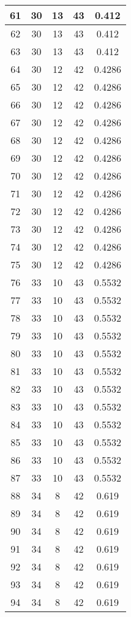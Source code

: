 \documentclass[letterpaper, 12pt]{article}
\begin{document}
\begin{longtable}{|c|c|c|c|c|}
\hline
61 & 30 & 13 & 43 & 0.412 \\
\hline
62 & 30 & 13 & 43 & 0.412 \\
\hline
63 & 30 & 13 & 43 & 0.412 \\
\hline
64 & 30 & 12 & 42 & 0.4286 \\
\hline
65 & 30 & 12 & 42 & 0.4286 \\
\hline
66 & 30 & 12 & 42 & 0.4286 \\
\hline
67 & 30 & 12 & 42 & 0.4286 \\
\hline
68 & 30 & 12 & 42 & 0.4286 \\
\hline
69 & 30 & 12 & 42 & 0.4286 \\
\hline
70 & 30 & 12 & 42 & 0.4286 \\
\hline
71 & 30 & 12 & 42 & 0.4286 \\
\hline
72 & 30 & 12 & 42 & 0.4286 \\
\hline
73 & 30 & 12 & 42 & 0.4286 \\
\hline
74 & 30 & 12 & 42 & 0.4286 \\
\hline
75 & 30 & 12 & 42 & 0.4286 \\
\hline
76 & 33 & 10 & 43 & 0.5532 \\
\hline
77 & 33 & 10 & 43 & 0.5532 \\
\hline
78 & 33 & 10 & 43 & 0.5532 \\
\hline
79 & 33 & 10 & 43 & 0.5532 \\
\hline
80 & 33 & 10 & 43 & 0.5532 \\
\hline
81 & 33 & 10 & 43 & 0.5532 \\
\hline
82 & 33 & 10 & 43 & 0.5532 \\
\hline
83 & 33 & 10 & 43 & 0.5532 \\
\hline
84 & 33 & 10 & 43 & 0.5532 \\
\hline
85 & 33 & 10 & 43 & 0.5532 \\
\hline
86 & 33 & 10 & 43 & 0.5532 \\
\hline
87 & 33 & 10 & 43 & 0.5532 \\
\hline
88 & 34 & 8 & 42 & 0.619 \\
\hline
89 & 34 & 8 & 42 & 0.619 \\
\hline
90 & 34 & 8 & 42 & 0.619 \\
\hline
91 & 34 & 8 & 42 & 0.619 \\
\hline
92 & 34 & 8 & 42 & 0.619 \\
\hline
93 & 34 & 8 & 42 & 0.619 \\
\hline
94 & 34 & 8 & 42 & 0.619 \\

\end{longtable}
\end{document}
